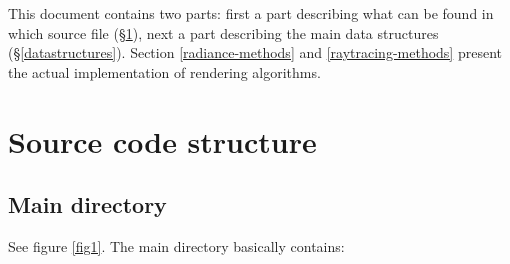 \documentclass[11pt]{report}
\begin{document}
This document contains two parts: first a part describing what can be
found in which source file (\S\ref{codestructure}), next a part describing
the main data structures (\S\ref{datastructures}). Section
\ref{radiance-methods} and \ref{raytracing-methods} present the actual 
implementation of rendering algorithms.

\chapter{Source code structure}
\label{codestructure}

\section{Main directory}

See figure \ref{fig1}. The main directory basically contains:
\end{document}
